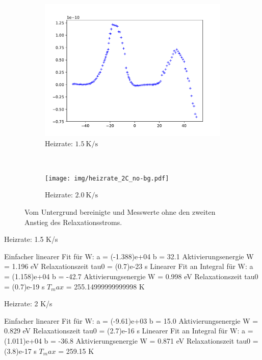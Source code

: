 \begin{figure}[htp]
    \centering
    \begin{subfigure}[t]{0.5\textwidth}
        \centering
        \includegraphics[width=\textwidth]{img/heizrate_15C_no-bg.pdf}
        \caption{Heizrate: $\SI{1.5}{\kelvin\per\second}$}
    \end{subfigure}%
    ~
    \begin{subfigure}[t]{0.5\textwidth}
        \centering
        \texttt{[image: img/heizrate\_2C\_no-bg.pdf]}
        \caption{Heizrate: $\SI{2.0}{\kelvin\per\second}$}
    \end{subfigure}
    \caption{Vom Untergrund bereinigte und Messwerte ohne den zweiten Anstieg des Relaxationsstroms.}
    \label{fig:no-bg}
\end{figure}

Heizrate: 1.5 K/s

Einfacher linearer Fit für W:
a = (-1.388)e+04
b = 32.1
Aktivierungsenergie W = 1.196 eV
Relaxationszeit tau0 = (0.7)e-23 s
Linearer Fit an Integral für W:
a = (1.158)e+04
b = -42.7
Aktivierungsenergie W = 0.998 eV
Relaxationszeit tau0 = (0.7)e-19 s
$T_max$ = 255.14999999999998 K

Heizrate: 2 K/s

Einfacher linearer Fit für W:
a = (-9.61)e+03
b = 15.0
Aktivierungsenergie W = 0.829 eV
Relaxationszeit tau0 = (2.7)e-16 s
Linearer Fit an Integral für W:
a = (1.011)e+04
b = -36.8
Aktivierungsenergie W = 0.871 eV
Relaxationszeit tau0 = (3.8)e-17 s
$T_max$ = 259.15 K

